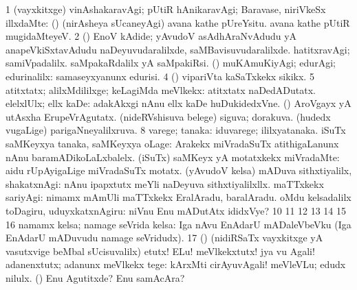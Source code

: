 {{\noindent
\gl{\pagu}
\expl{}
\bmng
\bnum
\num{1}  (vayxkitxge) vinAshakaravAgi; pUtiR hAnikaravAgi; Baravase, niriVkeSx illxdaMte:  (\AmA) (nirAsheya sUcaneyAgi) avana kathe pUreYsitu. avana kathe pUtiR mugidaMteyeV. 
\num{2}  (\AmA) EnoV kAdide; yAvudoV asAdhAraNvAdudu yA anapeVkiSxtavAdudu naDeyuvudaralilxde, saMBavisuvudaralilxde. 
  
\banum
{} hatitxravAgi; samiVpadalilx. 
 saMpakaRdalilx yA saMpakiRsi. 
 (\AmA) muKAmuKiyAgi; edurAgi; edurinalilx:  samaseyxyanunx edurisi. 
\eanum
\numie
\num{4}  (\AmA) vipariVta kaSaTxkekx sikikx. 
\num{5}  
  
\banum
{} atitxtatx; alilxMdililxge; keLagiMda meVlkekx:  atitxtatx naDedADutatx. 
 elelxlUlx; ellx kaDe:  adakAkxgi nAnu ellx kaDe huDukidedxVne. 
 (\AmA) AroVgayx yA utAsxha ErupeVrAgutatx. 
\eanum
\numie
{}  
\banum
{} (nideRVshisuva belege) siguva; dorakuva. 
 (hudedx \mo vugaLige) parigaNneyalilxruva. 
\eanum
\numie
\num{8}  
\banum
{} varege; tanaka:  iduvarege; ililxyatanaka. 
 iSuTx saMKeyxya tanaka, saMKeyxya oLage:  Arakekx miVradaSuTx atithigaLanunx nAnu baramADikoLaLxbalelx. 
 (iSuTx) saMKeyx yA motatxkekx miVradaMte:  aidu rUpAyigaLige miVradaSuTx motatx. 
 (yAvudoV kelsa) mADuva sithxtiyalilx, shakatxnAgi:  nAnu ipapxtutx meYli naDeyuva sithxtiyalilxllx. 
 maTTxkekx sariyAgi:  nimamx mAmUli maTTxkekx EralAradu, baralAradu. 
 oMdu kelsadalilx toDagiru, uduyxkatxnAgiru:  niVnu Enu mADutAtx ididxVye? 
\eanum
\numie
\num{10}  
\num{11}  
\num{12}  
\num{13}  
\num{14}  
\num{15}  
\num{16}  namamx kelsa; namage seVrida kelsa:  Iga nAvu EnAdarU mADaleVbeVku (Iga EnAdarU mADuvudu namage seVridudx). 
\num{17}  (\BAavayx) (nidiRSaTx vayxkitxge yA vasutxvige beMbal sUcisuvalilx) etutx! ELu! meVlkekxtutx! jya \mo vu Agali! adanenxtutx; adanunx meVlkekx tege:  kArxMti cirAyuvAgali!  meVleVLu; edudx nilulx. 
  (\AmA) 
\banum
{} Enu Agutitxde? 
 Enu samAcAra? 
\eanum
\numie
\enum
\emng
\eentry

}}
